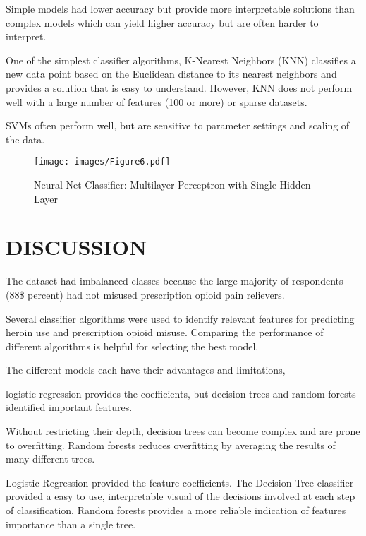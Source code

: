 \documentclass[sigconf]{acmart}
\begin{document}
Simple models had lower accuracy but provide more interpretable solutions 
than complex models which can yield higher accuracy but are often harder 
to interpret. 

One of the simplest classifier algorithms, K-Nearest Neighbors (KNN)
classifies a new data point based on the Euclidean distance to its 
nearest neighbors and provides a solution that is easy to understand. 
However, KNN does not perform well with a large number of features 
(100 or more) or sparse datasets.

SVMs often perform well, but are sensitive to parameter settings 
and scaling of the data. 

\begin{figure}[!ht]
  \centering\texttt{[image: images/Figure6.pdf]}
  \caption{Neural Net Classifier: Multilayer Perceptron with Single Hidden Layer}
  \label{f:Figur6}
\end{figure}




\section{DISCUSSION}


The dataset had imbalanced classes because the large majority of respondents 
(88\$ percent) had not misused prescription opioid pain relievers. 


Several classifier algorithms were used to identify relevant features for 
predicting heroin use and prescription opioid misuse. Comparing the performance 
of different algorithms is helpful for  selecting the best model. 

The different models each have their advantages and limitations, 

logistic regression provides the coefficients, but decision trees and 
random forests identified important features.

Without restricting their depth, decision trees can become complex and are 
prone to overfitting. Random forests reduces overfitting by averaging the results of many different
trees.

Logistic Regression provided the feature coefficients. 
The Decision Tree classifier provided a easy to use, interpretable visual of
the decisions involved at each step of classification. Random forests provides
a more reliable indication of features importance than a single tree. 
\end{document}
